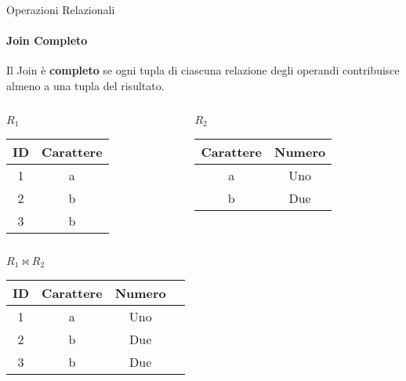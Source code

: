     \begin{frame}{Operazioni Relazionali}
        \framesubtitle{Join Completo}
        Il Join \`e \textbf{completo} se ogni tupla di ciascuna relazione degli operandi contribuisce almeno a una tupla del risultato.
        \begin{columns}
            \begin{column}{0.48\textwidth}
                \centering
                {\small $R_1$}
                \newline
        \begin{tabular}{|c|c|}
            \hline
            \rowcolor{cyan!30}ID & Carattere \\
            \hline
            1 & \cellcolor{green!30}a \\ \hline
            2 & \cellcolor{red!30}b \\ \hline
            3 & \cellcolor{red!30}b \\ \hline
            \end{tabular}
            \end{column}
            \begin{column}{0.48\textwidth}
                \centering
                {\small $R_2$}
                \newline
                \begin{tabular}{|c|c|}
                    \hline
                    \rowcolor{cyan!30} Carattere & Numero \\ \hline
                    \cellcolor{green!30}a & Uno \\ \hline
                    \cellcolor{red!30}b & Due \\ \hline
                    \end{tabular}
            \end{column}
        \end{columns}
        \vspace{.5cm}
        \centering
        $R_1 \bowtie R_2$
        \begin{tabular}{|c|c|c|c|}
            \hline
            \rowcolor{cyan!30} ID & Carattere & Numero \\ \hline
            1 & a & Uno \\ \hline
            2 & b & Due \\ \hline
            3 & b & Due \\ \hline
            \end{tabular}
    \end{frame}
